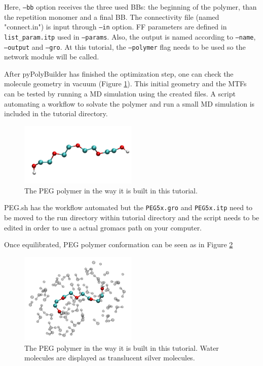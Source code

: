Here, \texttt{--bb} option receives the three used BBs: the beginning of the polymer, than the repetition monomer and a final BB.
The connectivity file (named "connect.in") is input through \texttt{--in} option.
FF parameters are defined in \texttt{list\_param.itp} used in \texttt{--params}.
Also, the output is named according to \texttt{--name}, \texttt{--output} and \texttt{--gro}.
At this tutorial, the \texttt{--polymer} flag needs to be used so the network module will be called.

After pyPolyBuilder has finished the optimization step, one can check the molecule geometry in vacuum (Figure \ref{fig:PEGPPB}). 
This initial geometry and the MTFs can be tested by running a MD simulation using the created files.
A script automating a workflow to solvate the polymer and  run a small MD simulation is included in the tutorial directory.

\begin{figure}
    \center
    \includegraphics[width=0.5\textwidth]{PEG/PEGPPB.png}
    \caption{The PEG polymer in the way it is built in this tutorial.}
    \label{fig:PEGPPB}
\end{figure}

PEG.sh has the workflow automated but the \texttt{PEG5x.gro} and \texttt{PEG5x.itp} need to be moved to the run directory within tutorial directory and the script needs to be edited in order to use a actual gromacs path on your computer.

Once equilibrated, PEG polymer conformation can be seen as in Figure \ref{fig:PEGSOL}

\begin{figure}
    \center
    \includegraphics[width=0.5\textwidth]{PEG/PEGSOL.png}
    \caption{The PEG polymer in the way it is built in this tutorial. Water molecules are displayed as translucent silver molecules.}
    \label{fig:PEGSOL}
\end{figure}